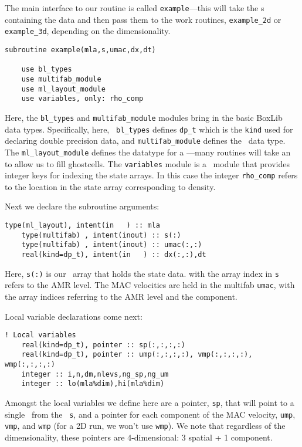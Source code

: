 The main interface to our routine is called {\tt example}---this will
take the \multifab s containing the data and then pass them to the
work routines, {\tt example\_2d} or {\tt example\_3d}, depending on
the dimensionality.  
\begin{lstlisting}[language={[95]fortran},mathescape=false]
  subroutine example(mla,s,umac,dx,dt)

    use bl_types
    use multifab_module
    use ml_layout_module
    use variables, only: rho_comp
\end{lstlisting}

\noindent Here, the {\tt bl\_types} and {\tt multifab\_module} modules
bring in the basic BoxLib data types. Specifically, here, {\tt
  bl\_types} defines {\tt dp\_t} which is the {\tt kind} used for
declaring double precision data, and {\tt multifab\_module} defines
the \multifab\ data type.  The {\tt ml\_layout\_module} defines the
datatype for a \mllayout---many routines will take an \mllayout
to allow us to fill ghostcells.  The {\tt variables} module is a \maestro\
module that provides integer keys for indexing the state arrays.  In
this case the integer {\tt rho\_comp} refers to the location in the
state array corresponding to density.

Next we declare the subroutine arguments:

\begin{lstlisting}[language={[95]fortran},mathescape=false]
    type(ml_layout), intent(in   ) :: mla
    type(multifab) , intent(inout) :: s(:)
    type(multifab) , intent(inout) :: umac(:,:)
    real(kind=dp_t), intent(in   ) :: dx(:,:),dt
\end{lstlisting}
Here, {\tt s(:)} is our \multifab\ array that holds the state data.
with the array index in {\tt s} refers to the AMR level.  The MAC 
velocities are held in the multifab {\tt umac}, with the array
indices referring to the AMR level and the component.


Local variable declarations come next:
\begin{lstlisting}[language={[95]fortran},mathescape=false]
    ! Local variables
    real(kind=dp_t), pointer :: sp(:,:,:,:)
    real(kind=dp_t), pointer :: ump(:,:,:,:), vmp(:,:,:,:), wmp(:,:,:,:)
    integer :: i,n,dm,nlevs,ng_sp,ng_um
    integer :: lo(mla%dim),hi(mla%dim)
\end{lstlisting}

\noindent Amongst the local variables we define here are a pointer,
{\tt sp}, that will point to a single \fab\ from the
\multifab\ {\tt s}, and a pointer for each component of the MAC
velocity, {\tt ump}, {\tt vmp}, and {\tt wmp} (for a 2D run,
we won't use {\tt wmp}).  We note that regardless of the dimensionality,
these pointers are 4-dimensional: 3 spatial + 1 component.

